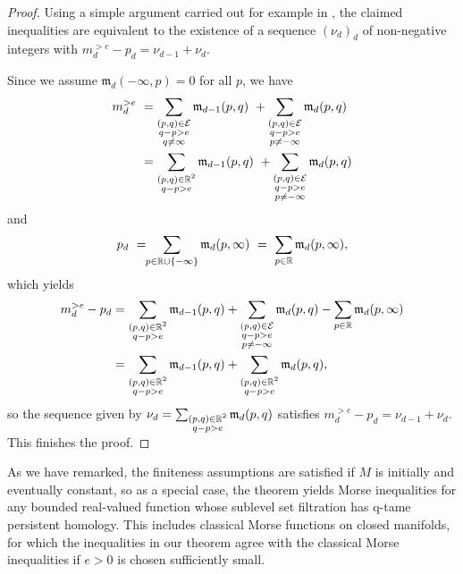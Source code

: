\begin{proof}
    Using a simple argument carried out for example in \cite[Section 11]{Morse.1940}, the claimed inequalities are equivalent to the existence of a sequence $(\nu_d)_d$ of non-negative integers with $m^{>e}_{d} - p_{d} = \nu_{d-1} + \nu_{d}$. 
    
    Since we assume $\mathfrak{m}_d(-\infty, p) = 0$ for all $p$, we have
    \begin{align*}
    m^{>e}_{d}
    \ &=
    \sum_{\substack{(p,q) \in \mathcal{E} \\ q - p > e \\ q \neq \infty}} \mathfrak{m}_{d-1}(p,q)
    \ +
    \sum_{\substack{(p,q) \in \mathcal{E} \\ q - p > e \\ p \neq -\infty}}\mathfrak{m}_d(p,q)
    \\
    &=
    \sum_{\substack{(p,q) \in \mathbb{R}^2 \\ q - p > e }} \mathfrak{m}_{d-1}(p,q)
    \ +
    \sum_{\substack{(p,q) \in \mathcal{E} \\ q - p > e \\ p \neq -\infty}}\mathfrak{m}_d(p,q)
    \end{align*}
    and
    \[
    p_{d}
    \ = \!\!
    \sum_{p \in \mathbb{R} \cup \{-\infty\}} \mathfrak{m}_d(p,\infty)
    \ = \
    \sum_{p \in \mathbb{R}} \mathfrak{m}_d(p,\infty),
    \]
    which yields
    \begin{align*}
    m^{>e}_{d} - p_{d}
    &= 
    \sum_{\substack{(p,q) \in \mathbb{R}^2 \\ q - p > e }} \mathfrak{m}_{d-1}(p,q)
    +
    \sum_{\substack{(p,q) \in \mathcal{E} \\ q - p > e \\ p \neq -\infty}}\mathfrak{m}_d(p,q)
    -
    \sum_{p \in \mathbb{R}} \mathfrak{m}_d(p,\infty)
    \\
    &=
    \sum_{\substack{(p,q) \in \mathbb{R}^2 \\ q - p > e }} \mathfrak{m}_{d-1}(p,q)
    +
    \sum_{\substack{(p,q) \in \mathbb{R}^2 \\ q - p > e }}\mathfrak{m}_d(p,q),
    \end{align*}
    so the sequence given by $\nu_d = \sum_{\substack{(p,q) \in \mathbb{R}^2 \\ q - p > e }}\mathfrak{m}_d(p,q)$ satisfies $m^{>e}_{d} - p_{d} = \nu_{d-1} + \nu_{d}$. This finishes the proof.
\end{proof}
As we have remarked, the finiteness assumptions are satisfied if $M$ is initially and eventually constant, so as a special case, the theorem yields Morse inequalities for any bounded real-valued function whose sublevel set filtration has q-tame persistent homology. This includes classical Morse functions on closed manifolds, for which the inequalities in our theorem agree with the classical Morse inequalities if $e > 0$ is chosen sufficiently small.


